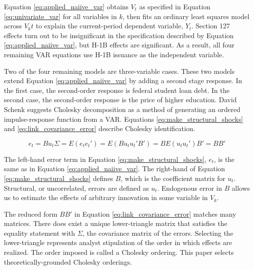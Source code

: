 \documentclass[review]{elsarticle}
\begin{document}
Equation \ref{eq:applied_naiive_var}
obtains $V_t$ as specified in Equation \ref{eq:univariate_var}
for all variables in $k$,
then fits an ordinary least squares model across $V_kt$ to explain the current-period dependent variable, $Y_t$.
Section 127 effects turn out to be insignificant in the specification described by Equation \ref{eq:applied_naiive_var},
but H-1B effects are significant.
As a result, all four remaining VAR equations use H-1B issuance as the independent variable.

Two of the four remaining models are three-variable cases.
These two models extend Equation \ref{eq:applied_naiive_var} by adding a second stage response.
In the first case, the second-order response is federal student loan debt.
In the second case, the second-order response is the price of higher education.
David Schenk suggests Cholesky decomposition as a method of generating an ordered impulse-response function from a VAR\cite{schenck_2016}.
Equations \ref{eq:make_structural_shocks} and \ref{eq:link_covariance_error} describe Cholesky identification.

\begin{subequations}
    \begin{equation}
        e_t = Bu_t
        \label{eq:make_structural_shocks}
    \end{equation}
    \begin{equation}
        \Sigma = E(e_t e_t')
        = E(Bu_tu_t'B')
        = B E(u_t u_t') B'
        = B B'
        \label{eq:link_covariance_error}
    \end{equation}
\end{subequations}

The left-hand error term in Equation \ref{eq:make_structural_shocks}, $e_t$,
is the same as in Equation \ref{eq:applied_naiive_var}.
The right-hand of Equation \ref{eq:make_structural_shocks} defines $B$,
which is the coefficient matrix for $u_t$.
Structural, or uncorrelated, errors are defined as $u_t$.
Endogenous error in $B$ allows us to estimate the effects of arbitrary innovation in some variable in $V_k$.

The reduced form $BB'$ in Equation \ref{eq:link_covariance_error} matches many matrices.
There does exist a unique lower-triangle matrix that satisfies
the equality statement with $\Sigma$, the covariance matrix of the errors.
Selecting the lower-triangle represents analyst stipulation of the order in which effects are realized.
The order imposed is called a Cholesky ordering.
This paper selects theoretically-grounded Cholesky orderings.
\end{document}
